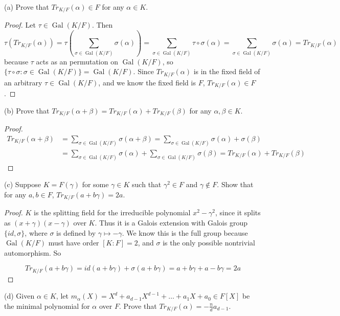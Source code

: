 \documentclass[10pt]{article}
\DeclareMathOperator*{\Gal}{Gal}
\begin{document}
\begin{enumerate}
(a) Prove that $Tr_{K/F}(\alpha) \in F$ for any $\alpha \in K$.

\begin{proof}
Let $\tau \in \Gal(K/F)$.  Then $$\tau(Tr_{K/F}(\alpha)) = \tau \left( \sum_{\sigma \in \Gal (K/F)} \sigma(\alpha) \right) = \sum_{\sigma \in \Gal (K/F)} \tau \circ\sigma(\alpha) = \sum_{\sigma \in \Gal (K/F)} \sigma(\alpha) = Tr_{K/F}(\alpha)$$
because $\tau$ acts as an permutation on $\Gal(K/F)$, so $\{\tau\circ\sigma : \sigma \in \Gal(K/F)\}= \Gal(K/F)$.  Since $Tr_{K/F}(\alpha)$ is in the fixed field of an arbitrary $\tau \in \Gal(K/F)$, and we know the fixed field is $F$, $Tr_{K/F}(\alpha) \in F$.
\end{proof}

(b) Prove that $Tr_{K/F}(\alpha + \beta) = Tr_{K/F}(\alpha) + Tr_{K/F}(\beta)$ for any $\alpha,\beta \in K$.

\begin{proof}
\begin{align*}
Tr_{K/F}(\alpha + \beta) &= \sum_{\sigma \in \Gal (K/F)} \sigma(\alpha + \beta) = \sum_{\sigma \in \Gal (K/F)} \sigma(\alpha) + \sigma(\beta)
\\
&= \sum_{\sigma \in \Gal (K/F)} \sigma(\alpha) + \sum_{\sigma \in \Gal (K/F)}\sigma(\beta)
= Tr_{K/F}(\alpha) + Tr_{K/F}(\beta)
\end{align*}
\end{proof}

(c) Suppose $K = F(\gamma)$ for some $\gamma \in K$ such that $\gamma^2 \in F$ and $\gamma \notin F$.  Show that for any $a,b \in F$, $Tr_{K/F}(a+b\gamma) = 2a$.

\begin{proof}
$K$ is the splitting field for the irreducible polynomial $x^2 - \gamma^2$, since it splits as $(x+\gamma)(x-\gamma)$ over $K$.  Thus it is a Galois extension with Galois group $\{id, \sigma\}$, where $\sigma$ is defined by $\gamma \mapsto -\gamma$.  We know this is the full group because $\Gal(K/F)$ must have order $[K:F] = 2$, and $\sigma$ is the only possible nontrivial automorphism.  So

$$
Tr_{K/F}(a+b\gamma) = id(a+b\gamma) + \sigma(a+b\gamma) = a+b\gamma + a-b\gamma = 2a
$$
\end{proof}

(d) Given $\alpha \in K$, let $m_\alpha (X) = X^d + a_{d-1}X^{d-1} + \ldots + a_1 X + a_0 \in F[X]$ be the minimal polynomial for $\alpha$ over $F$.  Prove that $Tr_{K/F}(\alpha) = -\frac{n}{d} a_{d-1}$.


\end{enumerate}
\end{document}
